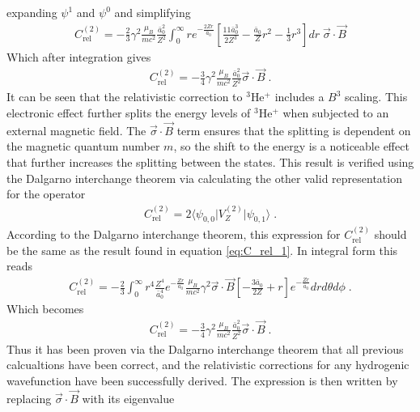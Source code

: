             \noindent expanding $\psi^1$ and $\psi^0$ and simplifying
            \begin{align}
                C_{\text{rel}}^{(2)} = -\frac{2}{3} \gamma^2 \frac{\mu_B}{mc^2}\frac{\bar{a}_0^2}{Z^2} \int_0^\infty r e^{-\frac{2Zr}{\bar{a}_0}} \left[ \frac{11 \bar{a}_0^3}{2Z^3} - \frac{\bar{a}_0}{Z}r^2 - \frac{1}{3} r^3 \right] dr \; \vec{\sigma} \cdot \vec{B}
            \end{align}
            \normalsize
            \noindent Which after integration gives 
            \begin{align}
                C_{\text{rel}}^{(2)} = -\frac{3}{4} \gamma^2 \frac{\mu_B}{mc^2} \frac{\bar{a}_0^2}{Z^2} \vec{\sigma} \cdot \vec{B} \;. \label{eq:C_rel_1}
            \end{align}
            \noindent It can be seen that the relativistic correction to $^3$He$^+$ includes a $B^3$ scaling. This electronic effect further splits the energy levels of $^3$He$^+$ when subjected to an external magnetic field. The $\vec{\sigma} \cdot \vec{B}$ term ensures that the splitting is dependent on the magnetic quantum number $m$, so the shift to the energy is a noticeable effect that further increases the splitting between the states. This result is verified using the Dalgarno interchange theorem via calculating the other valid representation for the operator
            \begin{align}
                C_{\text{rel}}^{(2)} = 2\langle \psi_{0,0} \vert V_{Z}^{(2)} \vert \psi_{0,1}\rangle\;.
            \end{align}
            According to the Dalgarno interchange theorem, this expression for $C_{\text{rel}}^{(2)}$ should be the same as the result found in equation \eqref{eq:C_rel_1}. In integral form this reads 
            \begin{align}
                C_{\text{rel}}^{(2)} = -\frac{2}{3} \int_0^\infty r^4 \frac{Z^4}{\bar{a}_0^4}e^{-\frac{Zr}{a_0}} \frac{\mu_B}{mc^2} \gamma^2 \vec{\sigma} \cdot \vec{B} \left[ - \frac{3\bar{a}_0}{2Z} + r \right] e^{-\frac{Zr}{\bar{a}_0}}dr d\theta d\phi\;.
            \end{align}
            \noindent Which becomes
            \begin{align}
                C_{\text{rel}}^{(2)} = -\frac{3}{4} \gamma^2 \frac{\mu_B}{mc^2} \frac{\bar{a}_0^2}{Z^2} \vec{\sigma} \cdot \vec{B} \;. \label{eq:C_rel_2}
            \end{align}
            \noindent Thus it has been proven via the Dalgarno interchange theorem that all previous calcualtions have been correct, and the relativistic corrections for any hydrogenic wavefunction have been successfully derived. The expression is then written by replacing $\vec{\sigma} \cdot \vec{B}$ with its eigenvalue 
